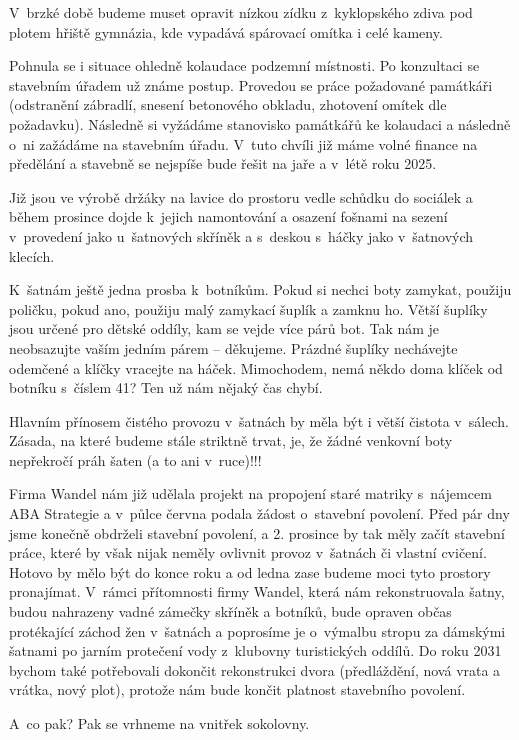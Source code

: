 \documentclass[11pt]{article}
\begin{document}
V~brzké době budeme muset opravit nízkou zídku z~kyklopského zdiva pod plotem hřiště gymnázia, kde vypadává spárovací omítka i celé kameny.

Pohnula se i situace ohledně kolaudace podzemní místnosti. Po konzultaci se stavebním úřadem už známe postup. Provedou se práce požadované památkáři (odstranění zábradlí, snesení betonového obkladu, zhotovení omítek dle požadavku). Následně si vyžádáme stanovisko památkářů ke kolaudaci a následně o~ni zažádáme na stavebním úřadu. 
V~tuto chvíli již máme volné finance na předělání a stavebně se nejspíše bude řešit na jaře a v~létě roku 2025. 

Již jsou ve výrobě držáky na lavice do prostoru vedle schůdku do sociálek a během prosince dojde k~jejich namontování a osazení fošnami na sezení v~provedení jako u~šatnových skříněk a s~deskou s~háčky jako v~šatnových klecích.

K~šatnám ještě jedna prosba k~botníkům. Pokud si nechci boty zamykat, použiju poličku, pokud ano, použiju malý zamykací šuplík a zamknu ho. Větší šuplíky jsou určené pro dětské oddíly, kam se vejde více párů bot. Tak nám je neobsazujte vaším jedním párem – děkujeme. Prázdné šuplíky nechávejte odemčené a klíčky vracejte na háček. Mimochodem, nemá někdo doma klíček od botníku s~číslem 41? Ten už nám nějaký čas chybí.

Hlavním přínosem čistého provozu v~šatnách by měla být i větší čistota v~sálech. Zásada, na které budeme stále striktně trvat, je, že žádné venkovní boty nepřekročí práh šaten (a to ani v~ruce)!!!

Firma Wandel nám již udělala projekt na propojení staré matriky s~nájemcem ABA Strategie a v~půlce června podala žádost o~stavební povolení. Před pár dny jsme konečně obdrželi stavební povolení, a 2. prosince by tak měly začít stavební práce, které by však nijak neměly ovlivnit provoz v~šatnách či vlastní cvičení. Hotovo by mělo být do konce roku a od ledna zase budeme moci tyto prostory pronajímat.
V~rámci přítomnosti firmy Wandel, která nám rekonstruovala šatny, budou nahrazeny vadné zámečky skříněk a botníků, bude opraven občas protékající záchod žen v~šatnách a poprosíme je o~výmalbu stropu za dámskými šatnami po jarním protečení vody z~klubovny turistických oddílů.
Do roku 2031 bychom také potřebovali dokončit rekonstrukci dvora (předláždění, nová vrata a vrátka, nový plot), protože nám bude končit platnost stavebního povolení.

A~co pak? Pak se vrhneme na vnitřek sokolovny. 
\end{document}
